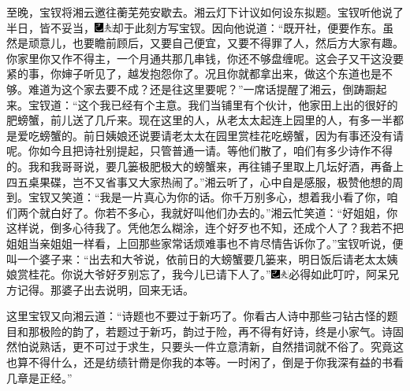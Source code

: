 至晚，宝钗将湘云邀往蘅芜苑安歇去。湘云灯下计议如何设东拟题。宝钗听他说了半日，皆不妥当，{\includegraphics[width=3mm]{../Images/00003}\includegraphics[width=3mm]{../Images/00012}\footnotesize \kaishu 却于此刻方写宝钗。}因向他说道：``既开社，便要作东。虽然是顽意儿，也要瞻前顾后，又要自己便宜，又要不得罪了人，然后方大家有趣。你家里你又作不得主，一个月通共那几串钱，你还不够盘缠呢。这会子又干这没要紧的事，你婶子听见了，越发抱怨你了。况且你就都拿出来，做这个东道也是不够。难道为这个家去要不成？还是往这里要呢？''一席话提醒了湘云，倒踌蹰起来。宝钗道：``这个我已经有个主意。我们当铺里有个伙计，他家田上出的很好的肥螃蟹，前儿送了几斤来。现在这里的人，从老太太起连上园里的人，有多一半都是爱吃螃蟹的。前日姨娘还说要请老太太在园里赏桂花吃螃蟹，因为有事还没有请呢。你如今且把诗社别提起，只管普通一请。等他们散了，咱们有多少诗作不得的。我和我哥哥说，要几篓极肥极大的螃蟹来，再往铺子里取上几坛好酒，再备上四五桌果碟，岂不又省事又大家热闹了。''湘云听了，心中自是感服，极赞他想的周到。宝钗又笑道：``我是一片真心为你的话。你千万别多心，想着我小看了你，咱们两个就白好了。你若不多心，我就好叫他们办去的。''湘云忙笑道：``好姐姐，你这样说，倒多心待我了。凭他怎么糊涂，连个好歹也不知，还成个人了？我若不把姐姐当亲姐姐一样看，上回那些家常话烦难事也不肯尽情告诉你了。''宝钗听说，便叫一个婆子来：``出去和大爷说，依前日的大螃蟹要几篓来，明日饭后请老太太姨娘赏桂花。你说大爷好歹别忘了，我今儿已请下人了。''{\includegraphics[width=3mm]{../Images/00003}\includegraphics[width=3mm]{../Images/00012}\footnotesize \kaishu 必得如此叮咛，阿呆兄方记得。}那婆子出去说明，回来无话。

这里宝钗又向湘云道：``诗题也不要过于新巧了。你看古人诗中那些刁钻古怪的题目和那极险的韵了，若题过于新巧，韵过于险，再不得有好诗，终是小家气。诗固然怕说熟话，更不可过于求生，只要头一件立意清新，自然措词就不俗了。究竟这也算不得什么，还是纺绩针黹是你我的本等。一时闲了，倒是于你我深有益的书看几章是正经。''

